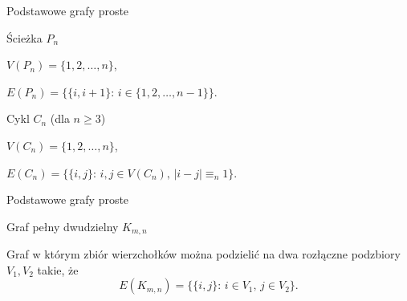 \documentclass[a4paper,10pt]{beamer}
\begin{document}
\begin{frame}{Podstawowe grafy proste}
	
	\begin{block}{Ścieżka $P_n$}
	\begin{minipage}{.55\textwidth}
		$V(P_n)=\{1,2,\ldots,n\}$,
		
		$E(P_n)=\big\{\{i,i+1\}:\,i\in\{1,2,\ldots,n-1\}\big\}$.
	\end{minipage}
	\begin{minipage}{.35\textwidth}
			\begin{center}
			
		\end{center}
	\end{minipage}
	\end{block}

	\begin{block}{Cykl $C_n$ (dla $n\geq3$)}
		
		\begin{minipage}{.6\textwidth}
			$V(C_n)=\{1,2,\ldots,n\}$,
			
			$E(C_n)=\big\{\{i,j\}:\,i,j\in V(C_n),\,|i-j|\equiv_n1\big\}$.
		\end{minipage}
		\begin{minipage}{.3\textwidth}
			\begin{center}
			
			\end{center}
		\end{minipage}
	\end{block}
	
\end{frame}


\begin{frame}{Podstawowe grafy proste}
	
	\begin{block}{Graf pełny dwudzielny $K_{m,n}$}
		
		\begin{minipage}{.6\textwidth}
			Graf w którym zbiór wierzchołków można podzielić na dwa rozłączne podzbiory $V_1,V_2$ takie, że
			$$E(K_{m,n})=\big\{\{i,j\}:\,i\in V_1,\,j\in V_2\big\}.$$
		\end{minipage}
		\begin{minipage}{.3\textwidth}
			\begin{center}
			
			\end{center}
		\end{minipage}
		
	\end{block}

\end{frame}
\end{document}
